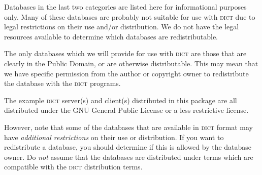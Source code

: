 \documentclass{article}
\newcommand{\dict}{\textsc{dict}\xspace}
\begin{document}
Databases in the last two categories are listed here for informational
purposes only.  Many of these databases are probably not suitable for use
with \dict due to legal restrictions on their use and/or distribution.  We
do not have the legal resources available to determine which databases are
redistributable.

The only databases which we will provide for use with \dict are those that
are clearly in the Public Domain, or are otherwise distributable.  This may
mean that we have specific permission from the author or copyright owner to
redistribute the database with the \dict programs.

The example \dict server(s) and client(s) distributed in this package are
all distributed under the GNU General Public License or a less restrictive
license.

However, note that some of the databases that are available in \dict format
may have \emph{additional restrictions} on their use or distribution.  If
you want to redistribute a database, you should determine if this is
allowed by the database owner.  Do \emph{not} assume that the databases are
distributed under terms which are compatible with the \dict distribution
terms.
\end{document}
